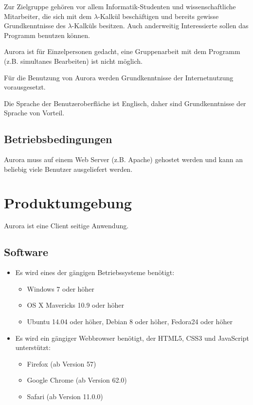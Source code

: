 \documentclass[parskip=full,11pt,twoside]{scrartcl}
\begin{document}
Zur Zielgruppe gehören vor allem Informatik-Studenten und wissenschaftliche Mitarbeiter, die sich mit dem $\lambda$-Kalkül beschäftigen und bereits gewisse Grundkenntnisse des $\lambda$-Kalküls besitzen. Auch anderweitig Interessierte sollen das Programm benutzen können.

Aurora ist für Einzelpersonen gedacht, eine Gruppenarbeit mit dem Programm (z.B. simultanes Bearbeiten) ist nicht möglich.

Für die Benutzung von Aurora werden Grundkenntnisse der Internetnutzung vorausgesetzt.

Die Sprache der Benutzeroberfläche ist Englisch, daher sind Grundkenntnisse der Sprache von Vorteil.

\subsection{Betriebsbedingungen}

Aurora muss auf einem Web Server (z.B. Apache) gehostet werden und kann an beliebig viele Benutzer ausgeliefert werden.


\newpage
\section{Produktumgebung}
Aurora ist eine Client seitige Anwendung.

\subsection{Software}
	\begin{itemize}
		\item Es wird eines der gängigen Betriebssysteme benötigt:
		\begin{itemize}
			\item Windows 7 oder höher
			\item OS X Mavericks 10.9 oder höher
			\item Ubuntu 14.04 oder höher, Debian 8 oder höher, Fedora24 oder höher
		\end{itemize}
		\item Es wird ein gängiger Webbrowser benötigt, der HTML5, CSS3 und JavaScript unterstützt:
			\begin{itemize}
				\item Firefox (ab Version 57)
				\item Google Chrome (ab Version 62.0)
				\item Safari (ab Version 11.0.0)
			\end{itemize}
	\end{itemize}
\end{document}
